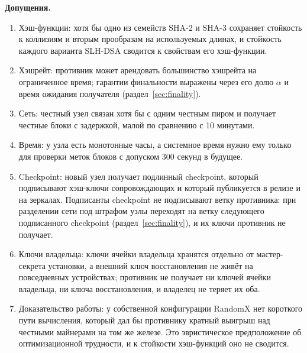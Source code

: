 \documentclass[10pt,a4paper]{article}
\begin{document}
\textbf{Допущения.}
\begin{enumerate}[label=Д\arabic*.]
\item Хэш-функции: хотя бы одно из семейств SHA-2 \cite{fips180} и SHA-3 \cite{fips202} сохраняет стойкость к коллизиям и вторым прообразам на используемых длинах, и стойкость каждого варианта SLH-DSA \cite{fips205} сводится к свойствам его хэш-функции.
\item Хэшрейт: противник может арендовать большинство хэшрейта на ограниченное время; гарантии финальности выражены через его долю $\alpha$ и время ожидания получателя (раздел~\ref{sec:finality}).
\item Сеть: честный узел связан хотя бы с одним честным пиром и получает честные блоки с задержкой, малой по сравнению с 10 минутами.
\item Время: у узла есть монотонные часы, а системное время нужно ему только для проверки меток блоков с допуском 300 секунд в будущее.
\item Checkpoint: новый узел получает подлинный checkpoint, который подписывают хэш-ключи сопровождающих и который публикуется в релизе и на зеркалах. Подписанты checkpoint не подписывают ветку противника: при разделении сети под штрафом узлы переходят на ветку следующего подписанного checkpoint (раздел~\ref{sec:finality}), и их ключи противник не получает.
\item Ключи владельца: ключи ячейки владельца хранятся отдельно от мастер-секрета установки, а внешний ключ восстановления не живёт на повседневных устройствах; противник не получает ни ключей ячейки владельца, ни ключа восстановления, и владелец не теряет их оба.
\item Доказательство работы: у собственной конфигурации RandomX нет короткого пути вычисления, который дал бы противнику кратный выигрыш над честными майнерами на том же железе. Это эвристическое предположение об оптимизационной трудности, и к стойкости хэш-функций оно не сводится.
\end{enumerate}
\end{document}
